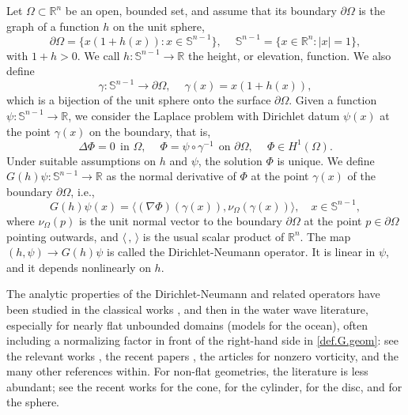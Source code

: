 \documentclass[10pt,reqno,a4paper]{article}
\numberwithin{equation}{section}
\theoremstyle{plain}
\theoremstyle{definition}
\newcommand{\R}{{\mathbb R}}
\renewcommand{\S}{{\mathbb S}}
\newcommand{\Om}{\Omega}
\newcommand{\la}{\langle}
\newcommand{\ra}{\rangle}
\newcommand{\pa}{\partial}
\newcommand{\grad}{\nabla}
\begin{document}
Let $\Om \subset \R^n$ be an open, bounded set, and assume that its boundary $\pa \Om$  
is the graph of a function $h$ on the unit sphere, 
\begin{equation} \label{def.pa.Om}
\pa \Om = \{ x (1 + h(x)) : x \in \S^{n-1} \}, \quad \ 
\S^{n-1} = \{ x \in \R^n : |x| = 1 \},
\end{equation}
with $1 + h > 0$. We call $h  : \S^{n-1} \to \R$ the height, or elevation, function.  
We also define 
\begin{equation} \label{def.gamma}
\gamma : \S^{n-1} \to \pa \Om, \quad \ 
\gamma(x) = x (1 + h(x)),
\end{equation}
which is a bijection of the unit sphere onto the surface $\pa \Omega$. 
Given a function $\psi : \S^{n-1} \to \R$, we consider the Laplace problem 
with Dirichlet datum $\psi(x)$ at the point $\gamma(x)$ on the boundary, that is,  
\begin{equation} \label{problem.in.Om}
\Delta \Phi = 0 \ \ \text{in } \Om, \quad \ 
\Phi = \psi \circ \gamma^{-1} \ \ \text{on } \pa \Om, \quad \ 
\Phi \in H^1(\Om).
\end{equation}
Under suitable assumptions on $h$ and $\psi$, the solution $\Phi$ is unique. 
We define $G(h)\psi : \S^{n-1} \to \R$ as the normal derivative of $\Phi$ 
at the point $\gamma(x)$ of the boundary $\pa \Om$, i.e., 
\begin{equation} \label{def.G.geom}
G(h)\psi (x) = \la (\grad \Phi)(\gamma(x)) , \nu_{\Om}(\gamma(x)) \ra, 
\quad x \in \S^{n-1},
\end{equation}
where $\nu_\Om(p)$ is the unit normal vector to the boundary $\pa \Om$ 
at the point $p \in \pa \Om$ pointing outwards, 
and $\la \, , \, \ra$ is the usual scalar product of $\R^n$. 
The map $(h, \psi) \to G(h)\psi$ is called the Dirichlet-Neumann operator. 
It is linear in $\psi$, and it depends nonlinearly on $h$. 

The analytic properties of the Dirichlet-Neumann and related operators 
have been studied in the classical works \cite{Calderon, Coifman.Meyer}, 
and then in the water wave literature, 
especially for nearly flat unbounded domains (models for the ocean), 
often including a normalizing factor in front of the right-hand side in \eqref{def.G.geom}: 
see the relevant works \cite{Alazard.Delort, Alazard.Metivier, 
Craig.Nicholls, Craig.Schanz.Sulem, Lannes.book}, 
the recent papers \cite{Alazard.Burq.Zuily1, Berti.Maspero.Ventura, Feola.Montalto.Terracina}, 
the articles \cite{Groves.Nilsson.Pasquali.Wahlen, Pasquali} for nonzero vorticity, 
and the many other references within. 
For non-flat geometries, the literature is less abundant; 
see the recent works \cite{Huang.Karakhanyan.cone} for the cone,
\cite{Huang.Karakhanyan.jets, Yang} for the cylinder,
\cite{LaScala} for the disc, 
and \cite{BJL, Beyer.Gunther, Shao.On.the.Cauchy, Shao.Toolbox} for the sphere. 
\end{document}
